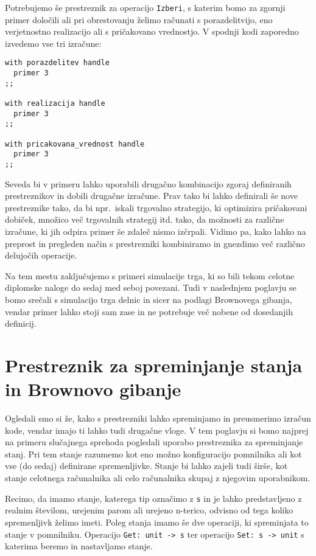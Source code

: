 \documentclass[a4paper,12pt]{article}
\theoremstyle{definition} %
\begin{document}
Potrebujemo še prestreznik za operacijo \lstinline{Izberi}, s katerim bomo za zgornji primer določili ali pri obrestovanju želimo računati s porazdelitvijo, eno verjetnostno realizacijo ali s pričakovano vrednostjo. V spodnji kodi zaporedno izvedemo vse tri izračune:
\begin{lstlisting}
with porazdelitev handle
  primer 3
;;

with realizacija handle
  primer 3
;;

with pricakovana_vrednost handle
  primer 3
;;
\end{lstlisting}
Seveda bi v primeru lahko uporabili drugačno kombinacijo zgoraj definiranih prestreznikov in dobili drugačne izračune. Prav tako bi lahko definirali še nove prestreznike tako, da bi npr.\ iskali trgovalno strategijo, ki optimizira pričakovani dobiček, množico več trgovalnih strategij itd. tako, da možnosti za različne izračune, ki jih odpira primer še zdaleč nismo izčrpali. Vidimo pa, kako lahko na preprost in pregleden način s prestrezniki kombiniramo in gnezdimo več različno delujočih operacije. 

Na tem mestu zaključujemo s primeri simulacije trga, ki so bili tekom celotne diplomske naloge do sedaj med seboj povezani. Tudi v naslednjem poglavju se bomo srečali s simulacijo trga delnic in sicer na podlagi Brownovega gibanja, vendar primer lahko stoji sam zase in ne potrebuje več nobene od dosedanjih definicij.

\section{Prestreznik za spreminjanje stanja in Brownovo gibanje} 

Ogledali smo si že, kako s prestrezniki lahko spreminjamo in preusmerimo izračun kode, vendar imajo ti lahko tudi drugačne vloge. V tem poglavju si bomo najprej na primeru slučajnega sprehoda pogledali uporabo prestreznika za spreminjanje stanj. Pri tem stanje razumemo kot eno možno konfiguracijo pomnilnika ali kot vse (do sedaj) definirane spremenljivke. Stanje bi lahko zajeli tudi širše, kot stanje celotnega računalnika ali celo računalnika skupaj z njegovim uporabnikom. 

Recimo, da imamo stanje, katerega tip označimo z \lstinline{s} in je lahko predstavljeno z realnim številom, urejenim parom ali urejeno n-terico, odvisno od tega koliko spremenljivk želimo imeti. Poleg stanja imamo še dve operaciji, ki spreminjata to stanje v pomnilniku. Operacijo \lstinline{Get: unit -> s} ter operacijo \lstinline{Set: s -> unit} s katerima beremo in nastavljamo stanje.
\end{document}
